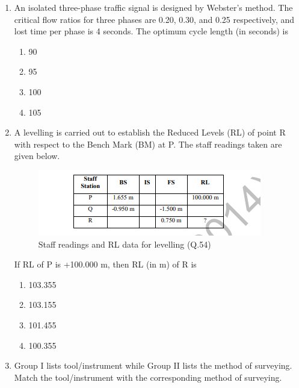 \documentclass[journal,12pt,onecolumn]{IEEEtran}
\theoremstyle{remark}
\begin{document}
\begin{enumerate}
\item An isolated three-phase traffic signal is designed by Webster's method. The critical flow ratios for three phases are 0.20, 0.30, and 0.25 respectively, and lost time per phase is 4 seconds. The optimum cycle length (in seconds) is \hfill{}

\begin{multicols}{4}
\begin{enumerate}
\item 90
\item 95
\item 100
\item 105
\end{enumerate}
\end{multicols}

\item A levelling is carried out to establish the Reduced Levels (RL) of point R with respect to the Bench Mark (BM) at P. The staff readings taken are given below. \hfill{}

\begin{figure}[H]
\centering
\includegraphics[width=0.7\linewidth]{figs/image18.png}
\caption{Staff readings and RL data for levelling (Q.54)}
\label{fig:q54}
\end{figure}

If RL of P is +100.000 m, then RL (in m) of R is

\begin{multicols}{4}
\begin{enumerate}
\item 103.355
\item 103.155
\item 101.455
\item 100.355
\end{enumerate}
\end{multicols}

\item Group I lists tool/instrument while Group II lists the method of surveying. Match the tool/instrument with the corresponding method of surveying. \hfill{}


\end{enumerate}
\end{document}

